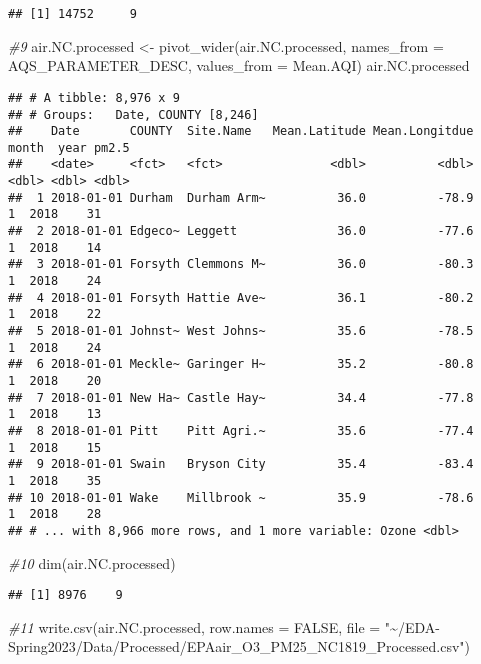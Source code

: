 \documentclass[
]{article}
\newenvironment{Shaded}{\begin{snugshade}}{\end{snugshade}}
\newcommand{\AttributeTok}[1]{\textcolor[rgb]{0.77,0.63,0.00}{#1}}
\newcommand{\CommentTok}[1]{\textcolor[rgb]{0.56,0.35,0.01}{\textit{#1}}}
\newcommand{\ConstantTok}[1]{\textcolor[rgb]{0.00,0.00,0.00}{#1}}
\newcommand{\FunctionTok}[1]{\textcolor[rgb]{0.00,0.00,0.00}{#1}}
\newcommand{\NormalTok}[1]{#1}
\newcommand{\OtherTok}[1]{\textcolor[rgb]{0.56,0.35,0.01}{#1}}
\newcommand{\StringTok}[1]{\textcolor[rgb]{0.31,0.60,0.02}{#1}}
\begin{document}
\begin{verbatim}
## [1] 14752     9
\end{verbatim}

\begin{Shaded}
\begin{Highlighting}[]
\CommentTok{\#9 }
\NormalTok{air.NC.processed }\OtherTok{\textless{}{-}} \FunctionTok{pivot\_wider}\NormalTok{(air.NC.processed, }\AttributeTok{names\_from =}\NormalTok{ AQS\_PARAMETER\_DESC, }\AttributeTok{values\_from =}\NormalTok{ Mean.AQI)}
\NormalTok{air.NC.processed}
\end{Highlighting}
\end{Shaded}

\begin{verbatim}
## # A tibble: 8,976 x 9
## # Groups:   Date, COUNTY [8,246]
##    Date       COUNTY  Site.Name   Mean.Latitude Mean.Longitdue month  year pm2.5
##    <date>     <fct>   <fct>               <dbl>          <dbl> <dbl> <dbl> <dbl>
##  1 2018-01-01 Durham  Durham Arm~          36.0          -78.9     1  2018    31
##  2 2018-01-01 Edgeco~ Leggett              36.0          -77.6     1  2018    14
##  3 2018-01-01 Forsyth Clemmons M~          36.0          -80.3     1  2018    24
##  4 2018-01-01 Forsyth Hattie Ave~          36.1          -80.2     1  2018    22
##  5 2018-01-01 Johnst~ West Johns~          35.6          -78.5     1  2018    24
##  6 2018-01-01 Meckle~ Garinger H~          35.2          -80.8     1  2018    20
##  7 2018-01-01 New Ha~ Castle Hay~          34.4          -77.8     1  2018    13
##  8 2018-01-01 Pitt    Pitt Agri.~          35.6          -77.4     1  2018    15
##  9 2018-01-01 Swain   Bryson City          35.4          -83.4     1  2018    35
## 10 2018-01-01 Wake    Millbrook ~          35.9          -78.6     1  2018    28
## # ... with 8,966 more rows, and 1 more variable: Ozone <dbl>
\end{verbatim}

\begin{Shaded}
\begin{Highlighting}[]
\CommentTok{\#10 }
\FunctionTok{dim}\NormalTok{(air.NC.processed)}
\end{Highlighting}
\end{Shaded}

\begin{verbatim}
## [1] 8976    9
\end{verbatim}

\begin{Shaded}
\begin{Highlighting}[]
\CommentTok{\#11 }
\FunctionTok{write.csv}\NormalTok{(air.NC.processed, }\AttributeTok{row.names =} \ConstantTok{FALSE}\NormalTok{, }\AttributeTok{file =} \StringTok{"\textasciitilde{}/EDA{-}Spring2023/Data/Processed/EPAair\_O3\_PM25\_NC1819\_Processed.csv"}\NormalTok{)}
\end{Highlighting}
\end{Shaded}
\end{document}
